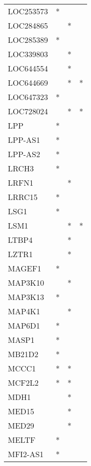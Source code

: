 \begin{longtable}{lccc}
LOC253573        &     * &    &         \\
LOC284865        &       &  * &         \\
LOC285389        &     * &    &         \\
LOC339803        &       &  * &         \\
LOC644554        &       &  * &         \\
LOC644669        &       &  * &       * \\
LOC647323        &     * &    &         \\
LOC728024        &       &  * &       * \\
LPP              &     * &    &         \\
LPP-AS1          &     * &    &         \\
LPP-AS2          &     * &    &         \\
LRCH3            &     * &    &         \\
LRFN1            &       &  * &         \\
LRRC15           &     * &    &         \\
LSG1             &     * &    &         \\
LSM1             &       &  * &       * \\
LTBP4            &       &  * &         \\
LZTR1            &       &  * &         \\
MAGEF1           &     * &    &         \\
MAP3K10          &       &  * &         \\
MAP3K13          &     * &    &         \\
MAP4K1           &       &  * &         \\
MAP6D1           &     * &    &         \\
MASP1            &     * &    &         \\
MB21D2           &     * &    &         \\
MCCC1            &     * &  * &         \\
MCF2L2           &     * &  * &         \\
MDH1             &       &  * &         \\
MED15            &       &  * &         \\
MED29            &       &  * &         \\
MELTF            &     * &    &         \\
MFI2-AS1         &     * &    &         \\

\end{longtable}
